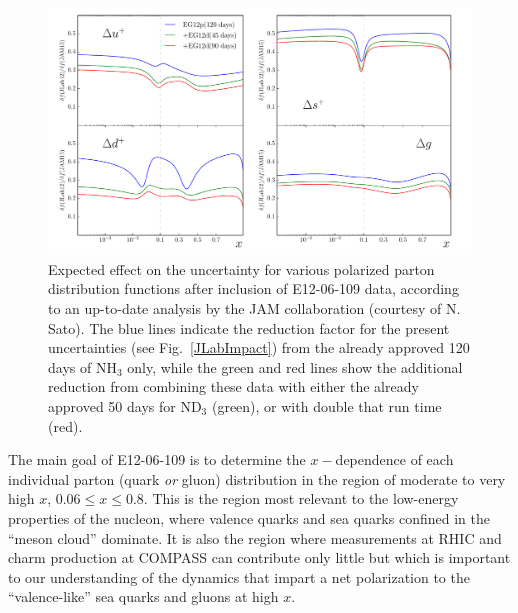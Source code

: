 \begin{figure} [!htbp]
\includegraphics[width=\linewidth]{dis/LTrat.pdf}
\caption{\baselineskip 13pt \small
Expected effect on the uncertainty for various polarized parton distribution
functions after inclusion of E12-06-109 data, according to an up-to-date
analysis by the JAM collaboration (courtesy of N. Sato). 
The blue lines indicate the reduction factor for the present uncertainties (see Fig.~\ref{JLabImpact}) 
from the already approved 120 days of NH$_3$ only, while the green and red lines show the additional reduction from
combining these data with either the already approved 50 days for ND$_3$ (green), or with double that run time (red).}
\label{pPDFs_exp}
\end{figure}

The main goal of E12-06-109 is to determine the $x-$dependence of each individual parton (quark {\em or} gluon) distribution
in the region of moderate to very high $x$, $0.06 \le x \le 0.8$. This is the region most relevant to the low-energy properties of the
nucleon, where valence quarks and sea quarks confined in the ``meson cloud'' dominate. It is also the region where 
measurements at RHIC and charm production at COMPASS can contribute only little but which is important
to our understanding of the dynamics that impart a net 
polarization to the ``valence-like'' sea quarks and gluons at high $x$. 

